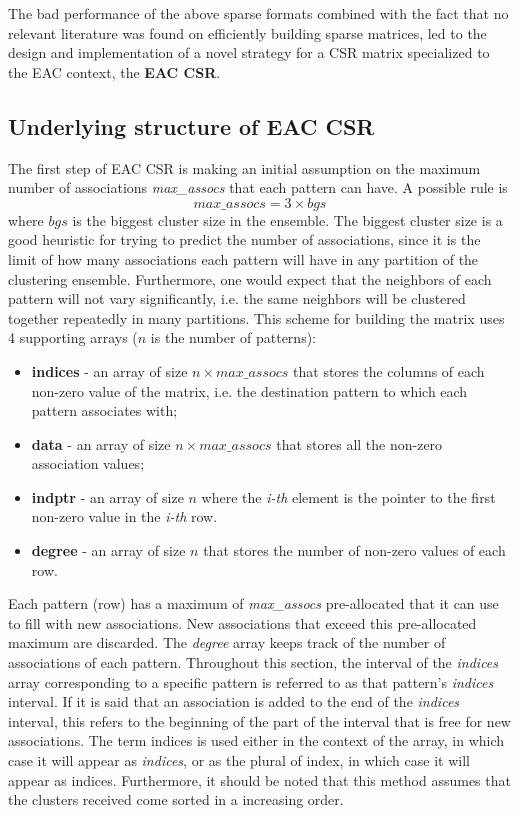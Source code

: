 The bad performance of the above sparse formats combined with the fact that no relevant literature was found on efficiently building sparse matrices, led to the design and implementation of a novel strategy for a CSR matrix specialized to the EAC context, the \textbf{EAC CSR}.

\subsection{Underlying structure of EAC CSR}

The first step of EAC CSR is making an initial assumption on the maximum number of associations \emph{max\_assocs} that each pattern can have.
A possible rule is $$max\_assocs = 3 \times bgs$$ where $bgs$ is the biggest cluster size in the ensemble.
The biggest cluster size is a good heuristic for trying to predict the number of associations, since it is the limit of how many associations each pattern will have in any partition of the clustering ensemble.
Furthermore, one would expect that the neighbors of each pattern will not vary significantly, i.e. the same neighbors will be clustered together repeatedly in many partitions.
This scheme for building the matrix uses 4 supporting arrays ($n$ is the number of patterns):

\begin{itemize}
	\item \textbf{indices} - an array of size $n \times max\_assocs$ that stores the columns of each non-zero value of the matrix, i.e. the destination pattern to which each pattern associates with;
	\item \textbf{data} - an array of size $n \times max\_assocs$ that stores all the non-zero association values;
	\item \textbf{indptr} - an array of size $n$  where the \emph{i-th} element is the pointer to the first non-zero value in the \emph{i-th} row.
	\item \textbf{degree} - an array of size $n$  that stores the number of non-zero values of each row.
\end{itemize}

Each pattern (row) has a maximum of \emph{max\_assocs} pre-allocated that it can use to fill with new associations.
New associations that exceed this pre-allocated maximum are discarded.
The \emph{degree} array keeps track of the number of associations of each pattern.
Throughout this section, the interval of the \emph{indices} array corresponding to a specific pattern is referred to as that pattern's \emph{indices} interval.
If it is said that an association is added to the end of the \emph{indices} interval, this refers to the beginning of the part of the interval that is free for new associations.
The term indices is used either in the context of the array, in which case it will appear as \emph{indices}, or as the plural of index, in which case it will appear as indices.
Furthermore, it should be noted that this method assumes that the clusters received come sorted in a increasing order.

